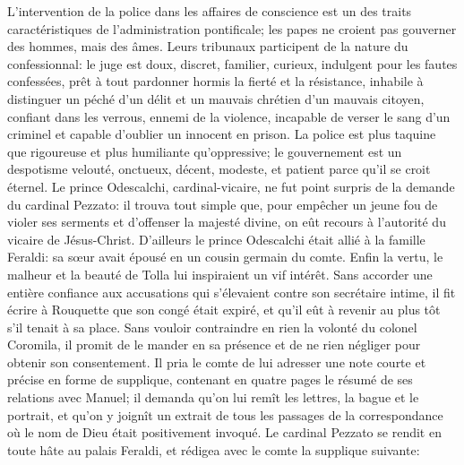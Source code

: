\enlargethispage{\baselineskip}

L'intervention de la police dans les affaires de conscience est un des traits caractéristiques de l'administration pontificale; les papes ne croient pas gouverner des hommes, mais des âmes. Leurs tribunaux participent de la nature du confessionnal: le juge est doux, discret, familier, curieux, indulgent pour les fautes confessées, prêt à tout pardonner hormis la fierté et la résistance, inhabile à distinguer un péché d'un délit et un mauvais chrétien d'un mauvais citoyen, confiant dans les verrous, ennemi de la violence, incapable de verser le sang d'un criminel et capable d'oublier un innocent en prison. La police est plus taquine que rigoureuse et plus humiliante qu'oppressive; le gouvernement est un despotisme velouté, onctueux, décent, modeste, et patient parce qu'il se croit éternel. Le prince Odescalchi, cardinal-vicaire, ne fut point surpris de la demande du cardinal Pezzato: il trouva tout simple que, pour empêcher un jeune fou de violer ses serments et d'offenser la majesté divine, on eût recours à l'autorité du vicaire de Jésus-Christ. D'ailleurs le prince Odescalchi était allié à la famille Feraldi: sa s\oe{}ur avait épousé en  un cousin germain du comte. Enfin la vertu, le malheur et la beauté de Tolla lui inspiraient un vif intérêt. Sans accorder une entière confiance aux accusations qui s'élevaient contre son secrétaire intime, il fit écrire à Rouquette que son congé était expiré, et qu'il eût à revenir au plus tôt s'il tenait à sa place. Sans vouloir contraindre en rien la volonté du colonel Coromila, il promit de le mander en sa présence et de ne rien négliger pour obtenir son consentement. Il pria le comte de lui adresser une note courte et précise en forme de supplique, contenant en quatre pages le résumé de ses relations avec Manuel; il demanda qu'on lui remît les lettres, la bague et le portrait, et qu'on y joignît un extrait de tous les passages de la correspondance où le nom de Dieu était positivement invoqué. Le cardinal Pezzato se rendit en toute hâte au palais Feraldi, et rédigea avec le comte la supplique suivante:
